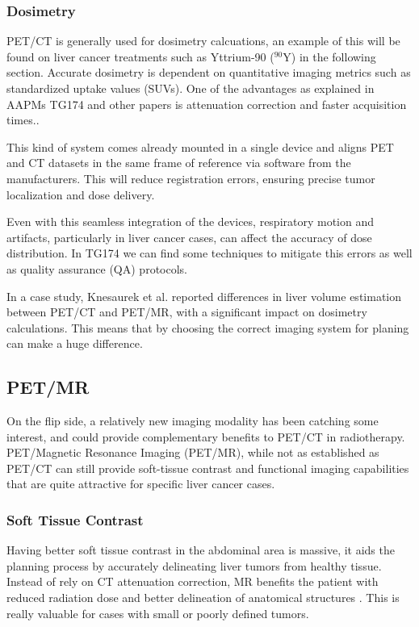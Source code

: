 \documentclass[11pt]{article} %
\begin{document}
\begin{multicols}{2}
\subsubsection{Dosimetry}
PET/CT is generally used for dosimetry calcuations, an example of this will be found on liver cancer treatments such as Yttrium-90 (\(^{90}\text{Y}\)) in the following section. Accurate dosimetry is dependent on quantitative imaging metrics such as standardized uptake values (SUVs). One of the advantages as explained in AAPMs TG174 and other papers is attenuation correction and faster acquisition times.\cite{knesaurek2018,TG174}. 

This kind of system comes already mounted in a single device and aligns PET and CT datasets in the same frame of reference via software from the manufacturers.\cite{TG174} This will reduce registration errors, ensuring precise tumor localization and dose delivery. 

Even with this seamless integration of the devices, respiratory motion and artifacts, particularly in liver cancer cases, can affect the accuracy of dose distribution. In TG174 we can find some techniques to mitigate this errors as well as quality assurance (QA) protocols.

In a case study, Knesaurek et al. \cite{knesaurek2018} reported differences in liver volume estimation between PET/CT and PET/MR, with a significant impact on dosimetry calculations. This means that by choosing the correct imaging system for planing can make a huge difference. 

\subsection{PET/MR}
On the flip side, a relatively new imaging modality has been catching some interest, and could provide complementary benefits to PET/CT in radiotherapy. PET/Magnetic Resonance Imaging (PET/MR), while not as established as PET/CT can still provide soft-tissue contrast and functional imaging capabilities that are quite attractive for specific liver cancer cases. 

\subsubsection{Soft Tissue Contrast}
Having better soft tissue contrast in the abdominal area is massive, it aids the planning process by accurately delineating liver tumors from healthy tissue. Instead of rely on CT attenuation correction, MR benefits the patient with reduced radiation dose and better delineation of anatomical structures \cite{knesaurek2018}. This is really valuable for cases with small or poorly defined tumors.


\end{multicols}
\end{document}
